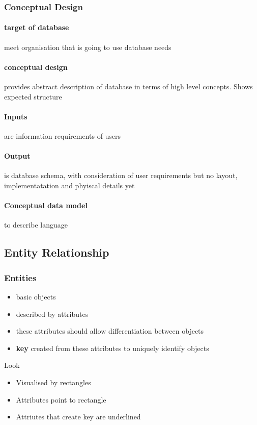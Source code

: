 \documentclass{article}
\begin{document}
		\subsubsection{Conceptual Design}
			\paragraph{target of database} meet organisation that is going to use database needs
			\paragraph{conceptual design} provides abstract description of database in terms of high level concepts. Shows expected structure
			\paragraph{Inputs} are information requirements of users
			\paragraph{Output} is database schema, with consideration of user requirements but no layout, implementatation and phyiscal details yet
			\paragraph{Conceptual data model} to describe language

	\subsection{Entity Relationship}
		\subsubsection{Entities}
			\begin{itemize}
				\item basic objects
				\item described by attributes
				\item these attributes should allow differentiation between objects
				\item \textbf{key} created from these attributes to uniquely identify objects
			\end{itemize}

			Look
			\begin{itemize}
				\item Visualised by rectangles
				\item Attributes point to rectangle
				\item Attriutes that create key are underlined
			\end{itemize}
\end{document}

